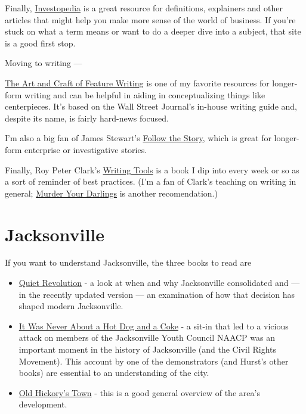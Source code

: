 \documentclass[
  12pt,
  american,
  letterpaperpaper,
  extrafontsizes,onecolumn,openright
  ]{memoir}
\providecommand{\tightlist}{%
  \setlength{\itemsep}{0pt}\setlength{\parskip}{0pt}}
\begin{document}
Finally, \href{https://www.investopedia.com/}{Investopedia} is a great resource for definitions, explainers and other articles that might help you make more sense of the world of business. If you're stuck on what a term means or want to do a deeper dive into a subject, that site is a good first stop.

Moving to writing ---

\href{https://www.amazon.com/Art-Craft-Feature-Writing-Journal/dp/0452261589/ref=sr_1_1}{The Art and Craft of Feature Writing} is one of my favorite resources for longer-form writing and can be helpful in aiding in conceptualizing things like centerpieces. It's based on the Wall Street Journal's in-house writing guide and, despite its name, is fairly hard-news focused.

I'm also a big fan of James Stewart's \href{https://www.amazon.com/Follow-Story-Write-Successful-Nonfiction/dp/0684850672/ref=sr_1_1}{Follow the Story}, which is great for longer-form enterprise or investigative stories.

Finally, Roy Peter Clark's \href{https://www.amazon.com/Writing-Tools-Essential-Strategies-Writer/dp/0316014990/ref=sr_1_1}{Writing Tools} is a book I dip into every week or so as a sort of reminder of best practices. (I'm a fan of Clark's teaching on writing in general; \href{https://www.amazon.com/Murder-Your-Darlings-Writing-Aristotle/dp/0316481882/ref=tmm_hrd_swatch_0}{Murder Your Darlings} is another recomendation.)

\hypertarget{jacksonville}{%
\section*{Jacksonville}\label{jacksonville}}

If you want to understand Jacksonville, the three books to read are

\begin{itemize}
\tightlist
\item
  \href{https://www.amazon.com/Quiet-Revolution-Consolidation-Jacksonville-Duval-Political/dp/0578565927/ref=sr_1_1}{Quiet Revolution} - a look at when and why Jacksonville consolidated and --- in the recently updated version --- an examination of how that decision has shaped modern Jacksonville.
\item
  \href{https://www.amazon.com/Personal-Account-Demonstrations-Jacksonville-Saturday/dp/1595941959/ref=sr_1_1}{It Was Never About a Hot Dog and a Coke} - a sit-in that led to a vicious attack on members of the Jacksonville Youth Council NAACP was an important moment in the history of Jacksonville (and the Civil Rights Movement). This account by one of the demonstrators (and Hurst's other books) are essential to an understanding of the city.
\item
  \href{https://www.amazon.com/Old-Hickorys-Town-Illustrated-Jacksonville/dp/B000OL8E9O/ref=sr_1_1}{Old Hickory's Town} - this is a good general overview of the area's development.
\end{itemize}
\end{document}
